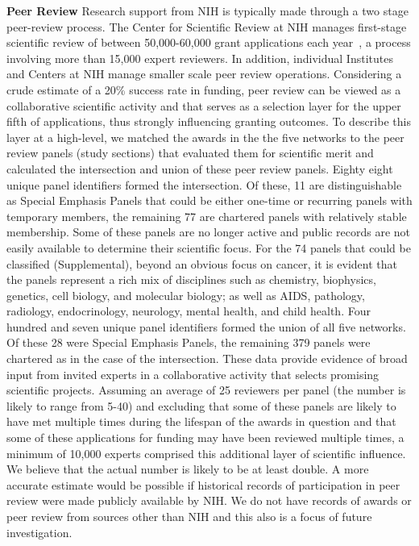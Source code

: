 \documentclass[10pt,letterpaper]{article}
\begin{document}
\textbf{Peer Review} Research support from NIH is typically made through a two stage peer-review process.  The Center for Scientific Review at NIH manages first-stage scientific review of between 50,000-60,000 grant applications each year~\cite{bibBoyack}, a process involving more than 15,000 expert reviewers. In addition, individual Institutes and Centers at NIH manage smaller scale peer review operations. Considering a crude estimate of a 20\% success rate in funding, peer review can be viewed as a collaborative scientific activity and that serves as a selection layer for the upper fifth of applications, thus strongly influencing granting outcomes. To describe this layer at a high-level, we matched the awards in the the five networks to the peer review panels (study sections) that evaluated them for scientific merit and calculated the intersection and union of these peer review panels. Eighty eight unique panel identifiers formed the intersection. Of these, 11 are distinguishable as Special Emphasis Panels that could be either one-time or recurring panels with temporary members, the remaining 77 are chartered panels with relatively stable membership. Some of these panels are no longer active and public records are not easily available to determine their scientific focus. For the 74 panels that could be classified (Supplemental), beyond an obvious focus on cancer, it is evident that the panels represent a rich mix of disciplines such as chemistry, biophysics, genetics, cell biology, and molecular biology; as well as AIDS, pathology, radiology, endocrinology, neurology, mental health, and child health. Four hundred and seven unique panel identifiers formed the union of all five networks. Of these 28 were Special Emphasis Panels, the remaining 379 panels were chartered as in the case of the intersection. These data provide evidence of broad input from invited experts in a collaborative activity that selects promising scientific projects. Assuming an average of 25 reviewers per panel (the number is likely to range from 5-40) and excluding that some of these panels are likely to have met multiple times during the lifespan of the awards in question and that some of these applications for funding may have been reviewed multiple times, a minimum of 10,000 experts comprised this additional layer of scientific influence. We believe that the actual number is likely to be at least double. A more accurate estimate would be possible if historical records of participation in peer review were made publicly available by NIH. We do not have records of awards or peer review from sources other than NIH and this also is a focus of future investigation.
\end{document}
